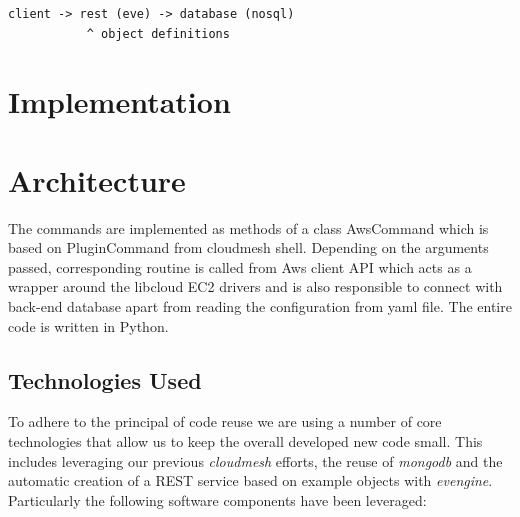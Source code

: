 \documentclass[9pt,twocolumn,twoside]{../../styles/osajnl}
\begin{document}
\begin{verbatim}
client -> rest (eve) -> database (nosql)
           ^ object definitions
\end{verbatim}

\section{Implementation}



\section{Architecture}

The commands are implemented as methods of a class AwsCommand which is
based on PluginCommand from cloudmesh shell. Depending on the
arguments passed, corresponding routine is called from Aws client API
which acts as a wrapper around the libcloud EC2 drivers
\cite{www-libcloud-ec2} and is also responsible to connect with
back-end database apart from reading the configuration from yaml
file. The entire code is written in Python.

\subsection{Technologies Used}

To adhere to the principal of code reuse we are using a number of core
technologies that allow us to keep the overall developed new code
small. This includes leveraging our previous {\it cloudmesh} efforts, the
reuse of {\it mongodb} and the automatic creation of a REST service based
on example objects with {\it evengine}. Particularly the following
software components have been leveraged:
\end{document}
